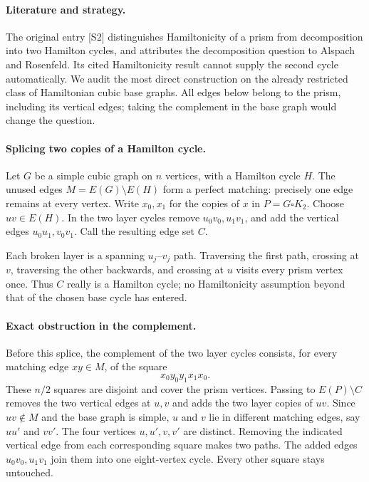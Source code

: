 \documentclass[11pt,a4paper]{article}
\begin{document}
\paragraph{Literature and strategy.}
The original entry [S2] distinguishes Hamiltonicity of a prism from decomposition into two Hamilton cycles, and attributes the decomposition question to Alspach and Rosenfeld. Its cited Hamiltonicity result cannot supply the second cycle automatically. We audit the most direct construction on the already restricted class of Hamiltonian cubic base graphs. All edges below belong to the prism, including its vertical edges; taking the complement in the base graph would change the question.

\paragraph{Splicing two copies of a Hamilton cycle.}
Let $G$ be a simple cubic graph on $n$ vertices, with a Hamilton cycle $H$. The unused edges $M=E(G)\setminus E(H)$ form a perfect matching: precisely one edge remains at every vertex. Write $x_0,x_1$ for the copies of $x$ in $P=G\square K_2$. Choose $uv\in E(H)$. In the two layer cycles remove $u_0v_0,u_1v_1$, and add the vertical edges $u_0u_1,v_0v_1$. Call the resulting edge set $C$.

Each broken layer is a spanning $u_j$--$v_j$ path. Traversing the first path, crossing at $v$, traversing the other backwards, and crossing at $u$ visits every prism vertex once. Thus $C$ really is a Hamilton cycle; no Hamiltonicity assumption beyond that of the chosen base cycle has entered.

\paragraph{Exact obstruction in the complement.}
Before this splice, the complement of the two layer cycles consists, for every matching edge $xy\in M$, of the square
\[
 x_0y_0y_1x_1x_0.
\]
These $n/2$ squares are disjoint and cover the prism vertices. Passing to $E(P)\setminus C$ removes the two vertical edges at $u,v$ and adds the two layer copies of $uv$. Since $uv\notin M$ and the base graph is simple, $u$ and $v$ lie in different matching edges, say $uu'$ and $vv'$. The four vertices $u,u',v,v'$ are distinct. Removing the indicated vertical edge from each corresponding square makes two paths. The added edges $u_0v_0,u_1v_1$ join them into one eight-vertex cycle. Every other square stays untouched.
\end{document}
